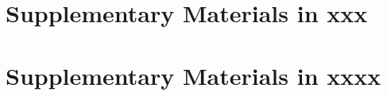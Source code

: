 \begin{appendices}

\section{Supplementary Materials in xxx}


\section{Supplementary Materials in xxxx}


\end{appendices}